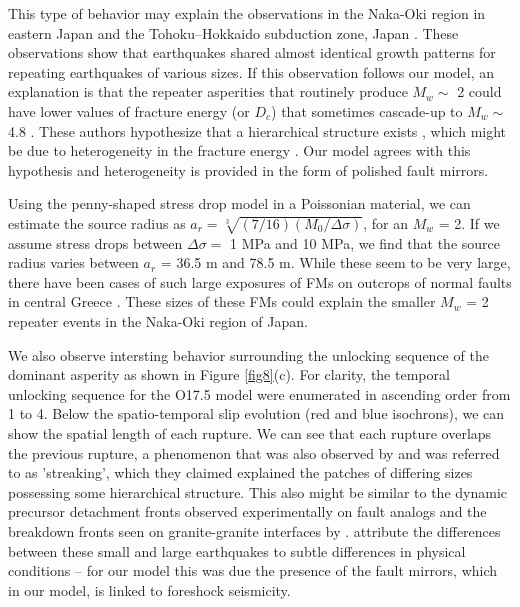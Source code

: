 \documentclass[preprint,1p, 10pt,authoryear]{elsarticle}
\begin{document}
This type of behavior may explain the observations in the Naka-Oki region in eastern Japan \citep{Okuda2018} and the Tohoku–Hokkaido subduction zone, Japan \citep{Ide2019}. These observations show that earthquakes shared almost identical growth patterns for repeating earthquakes of various sizes. If this observation follows our model, an explanation is that the repeater asperities that routinely produce  $M_{w} \sim$ 2  could have lower values of fracture energy (or $D_{c}$) that sometimes cascade-up to  $M_{w} \sim$ 4.8 \citep{Okuda2018a}.  These authors hypothesize that a hierarchical structure exists \citep[as depicted in fig. 5 of ][]{Okuda2018}, which might be due to heterogeneity in the fracture energy \citep{Ide2005, Aochi2014, Aochi2017}. Our model agrees with this hypothesis and heterogeneity is provided in the form of polished fault mirrors. 

Using the \citet{Eshelby1957} penny-shaped stress drop model in a Poissonian material, we can estimate the source radius as $a_{r} = \sqrt[3]{(7/16)(M_{0}/\Delta\sigma)}$, for an $M_{w}$ = 2. If we assume stress drops between $\Delta \sigma  = $ 1 MPa and 10 MPa, we find that the source radius varies between $a_{r}$ = 36.5 m and 78.5 m.  While these seem to be very large, there have been cases of such large exposures of FMs on outcrops of normal faults in central Greece \citep{Jackson1999}. These sizes of these FMs could explain the smaller $M_{w}$ = 2 repeater events in the Naka-Oki region of Japan.  

We also observe intersting behavior surrounding the unlocking sequence of the dominant asperity as shown in Figure \ref{fig8}(c). For clarity, the temporal unlocking sequence for the O17.5 model were enumerated in ascending order from 1 to 4.  Below the spatio-temporal slip evolution (red and blue isochrons), we can show the spatial length of each rupture. We can see that each rupture overlaps the previous rupture, a phenomenon that was also observed by \citet{Okuda2018a} and was referred to as 'streaking', which they claimed explained the patches of differing sizes possessing some hierarchical structure. This also might be similar to the dynamic precursor detachment fronts observed experimentally on fault analogs \citep{Rubinstein2004,Rubinstein2006} and the breakdown fronts seen on granite-granite interfaces by \citep{Ke2018}. \citet{Okuda2018a} attribute the differences between these small and large earthquakes to subtle differences in physical conditions -- for our model this was due the presence of the fault mirrors, which in our model, is linked to foreshock seismicity.
\end{document}
